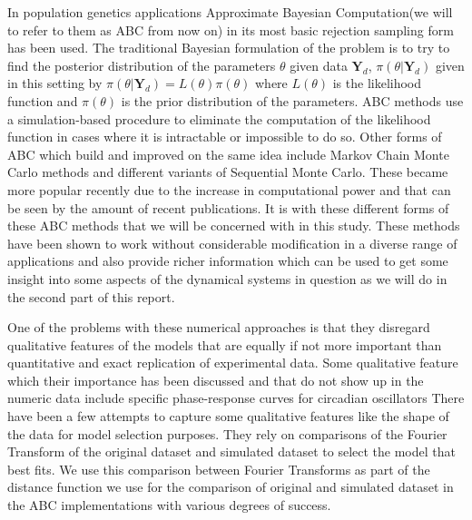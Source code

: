 \documentclass[12pt,a4paper,titlepage]{article}
\begin{document}
In population genetics applications Approximate Bayesian Computation(we will to refer to them as ABC from now on) in its most basic rejection sampling form has been used\cite{pritchard1999population}. The traditional Bayesian formulation of the problem is to try to find the posterior distribution of the parameters $\theta$ given data $\mathbf{Y}_{d}$, $\pi(\theta | \mathbf{Y}_{d})$ given in this setting by $\pi(\theta | \mathbf{Y}_{d}) = L(\theta)\pi(\theta)$ where $L(\theta)$ is the likelihood function and $\pi(\theta)$ is the prior distribution of the parameters. ABC methods use a simulation-based procedure to eliminate the computation of the likelihood function in cases where it is intractable or impossible to do so. Other forms of ABC which build and improved on the same idea include Markov Chain Monte Carlo methods\cite{marjoram2003markov} and different variants of Sequential Monte Carlo\cite{del2006sequential, sisson2007sequential, toni2009abc}. These became more popular recently due to the increase in computational power and that can be seen by the amount of recent publications. It is with these different forms of these ABC methods that we will be concerned with in this study. These methods have been shown to work without considerable modification in a diverse range of applications\cite{toni2009abc} and also provide richer information which can be used to get some insight into some aspects of the dynamical systems in question as we will do in the second part of this report.

One of the problems with these numerical approaches is that they disregard qualitative features of the models that are equally if not more important than quantitative and exact replication of experimental data. Some qualitative feature which their importance has been discussed and that do not show up in the numeric data include specific phase-response curves for circadian oscillators\cite{pfeuty2011robust}%
There have been a few attempts to capture some qualitative features like the shape of the data for model selection purposes. They rely on comparisons of the Fourier Transform of the original dataset and simulated dataset to select the model that best fits\cite{konopka2010gene}. We use this comparison between Fourier Transforms as part of the distance function we use for the comparison of original and simulated dataset in the ABC implementations with various degrees of success.
\end{document}
